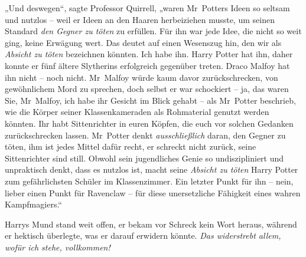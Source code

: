„Und deswegen“, sagte Professor Quirrell, „waren Mr~Potters Ideen so seltsam und nutzlos – weil er Ideen an den Haaren herbeiziehen musste, um seinen Standard \emph{den Gegner zu töten} zu erfüllen. Für ihn war jede Idee, die nicht so weit ging, keine Erwägung wert. Das deutet auf einen Wesenszug hin, den wir als \emph{Absicht zu töten} bezeichnen könnten. Ich habe ihn. Harry Potter hat ihn, daher konnte er fünf ältere Slytherins erfolgreich gegenüber treten. Draco Malfoy hat ihn nicht – noch nicht. Mr~Malfoy würde kaum davor zurückschrecken, von gewöhnlichem Mord zu sprechen, doch selbst er war schockiert – ja, das waren Sie, Mr~Malfoy, ich habe ihr Gesicht im Blick gehabt – als Mr~Potter beschrieb, wie die Körper seiner Klassenkameraden als Rohmaterial genutzt werden könnten. Ihr habt Sittenrichter in euren Köpfen, die euch vor solchen Gedanken zurückschrecken lassen. Mr~Potter denkt \emph{ausschließlich} daran, den Gegner zu töten, ihm ist jedes Mittel dafür recht, er schreckt nicht zurück, seine Sittenrichter sind still. Obwohl sein jugendliches Genie so undiszipliniert und unpraktisch denkt, dass es nutzlos ist, macht seine \emph{Absicht zu töten} Harry Potter zum gefährlichsten Schüler im Klassenzimmer. Ein letzter Punkt für ihn – nein, lieber einen Punkt für Ravenclaw – für diese unersetzliche Fähigkeit eines wahren Kampfmagiers.“

Harrys Mund stand weit offen, er bekam vor Schreck kein Wort heraus, während er hektisch überlegte, was er darauf erwidern könnte. \emph{Das widerstrebt allem, wofür ich stehe, vollkommen!}

